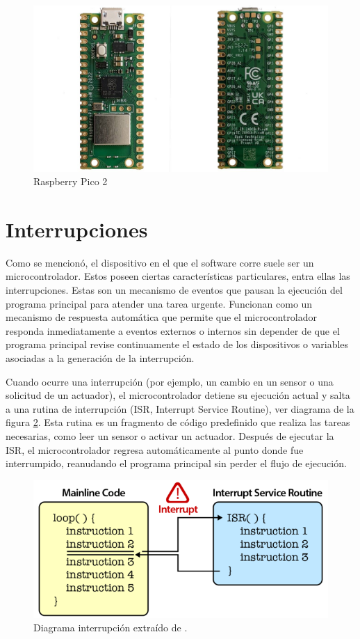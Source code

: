 \begin{figure}[h!]
	\caption{Raspberry Pico 2}
	\label{raspberry}
	\centering
    \includegraphics[width=0.6\linewidth]{raspberry_pico2.jpg}
\end{figure}


\section{Interrupciones}
Como se mencionó, el dispositivo en el que el software corre suele ser un microcontrolador. Estos poseen ciertas características particulares, entra ellas las interrupciones. Estas son un mecanismo de eventos que pausan la ejecución del programa principal para atender una tarea urgente. Funcionan como un mecanismo de respuesta automática que permite que el microcontrolador responda inmediatamente a eventos externos o internos sin depender de que el programa principal revise continuamente el estado de los dispositivos o variables asociadas a la generación de la interrupción.

Cuando ocurre una interrupción (por ejemplo, un cambio en un sensor o una solicitud de un actuador), el microcontrolador detiene su ejecución actual y salta a una rutina de interrupción (ISR, Interrupt Service Routine), ver diagrama de la figura \ref{interrupt}. Esta rutina es un fragmento de código predefinido que realiza las tareas necesarias, como leer un sensor o activar un actuador. Después de ejecutar la ISR, el microcontrolador regresa automáticamente al punto donde fue interrumpido, reanudando el programa principal sin perder el flujo de ejecución.

\begin{figure}[H]
	\centering
    \includegraphics[width=0.7\linewidth]{components_interrupt.png}
    \caption{Diagrama interrupción extraído de \cite{imgInterrupciones}.}
    \label{interrupt}
\end{figure}


